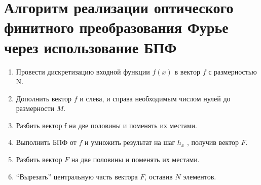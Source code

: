 \section*{Алгоритм реализации оптического финитного преобразования Фурье через использование БПФ}
{
	\begin{enumerate}
		\item Провести дискретизацию входной функции $f(x)$ в вектор $f$ с размерностью N.
		\item Дополнить вектор $f$ и слева, и справа необходимым числом нулей до размерности $M$.
		\item Разбить вектор f на две половины и поменять их местами.
		\item Выполнить БПФ от $f$ и умножить результат на шаг $h_x$ , получив вектор $F$.
		\item Разбить вектор $F$ на две половины и поменять их местами.
		\item \enquote{Вырезать} центральную часть вектора $F$, оставив $N$ элементов.
	\end{enumerate}
}
\newpage

\titleformat{\section}{\large\bfseries}{\thesection}{0.5em}{}
\titlespacing*{\section}{\parindent}{1ex}{1em}
